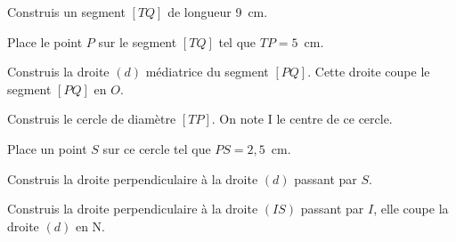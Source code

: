 \begin{myenumerate}
\item Construis un segment $[TQ]$ de longueur 9~cm.
\item Place le point $P$ sur le segment $[TQ]$ tel que $TP=5$~cm.
\item Construis la droite $(d)$ médiatrice du segment $[PQ]$. Cette
  droite coupe le segment $[PQ]$ en $O$.
\item Construis le cercle de diamètre $[TP]$. On note I le centre de ce cercle.
\item Place un point $S$ sur ce cercle tel que $PS=2,5$~cm.
\item Construis la droite perpendiculaire à la droite $(d)$ passant par $S$.
\item Construis la droite perpendiculaire à la droite $(IS)$ passant
  par $I$, elle coupe la droite $(d)$ en N.
\end{myenumerate}